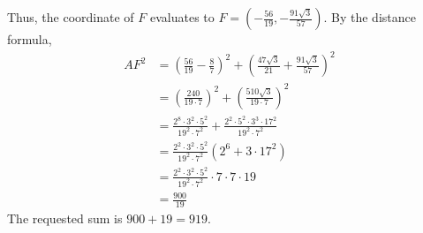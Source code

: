 \begin{enumerate}
 Thus, the coordinate of $F$ evaluates to $F=\left(-\frac{56}{19}, -\frac{91\sqrt{3}}{57}\right)$. By the distance formula,\begin{align*}AF^2&=\left(\frac{56}{19}-\frac{8}{7}\right)^2+\left(\frac{47\sqrt{3}}{21}+\frac{91\sqrt{3}}{57}\right)^2\\&=\left(\frac{240}{19\cdot 7}\right)^2+\left(\frac{510\sqrt{3}}{19\cdot 7}\right)^2\\&=\frac{2^8\cdot 3^2\cdot 5^2}{19^2\cdot 7^2}+\frac{2^2\cdot 5^2\cdot 3^3\cdot 17^2}{19^2\cdot 7^2}\\&=\frac{2^2\cdot 3^2\cdot 5^2}{19^2\cdot 7^2}(2^6+3\cdot 17^2)\\&=\frac{2^2\cdot 3^2\cdot 5^2}{19^2\cdot 7^2}\cdot 7\cdot 7\cdot 19\\&=\frac{900}{19}\end{align*}
The requested sum is $900+19=\boxed{919}$.

 


\end{enumerate}